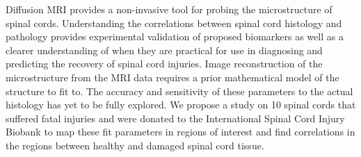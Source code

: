 Diffusion MRI provides a non-invasive tool for probing the microstructure of spinal cords. Understanding the correlations between spinal cord histology and pathology provides experimental validation of proposed biomarkers as well as a clearer understanding of when they are practical for use in diagnosing and predicting the recovery of spinal cord injuries. %
%
Image reconstruction of the microstructure from the MRI data requires a prior mathematical model of the structure to fit to. The accuracy and sensitivity of these parameters to the actual histology has yet to be fully explored. %
%
We propose a study on 10 spinal cords that suffered fatal injuries and were donated to the International Spinal Cord Injury Biobank to map these fit parameters in regions of interest and find correlations in the regions between healthy and damaged spinal cord tissue.